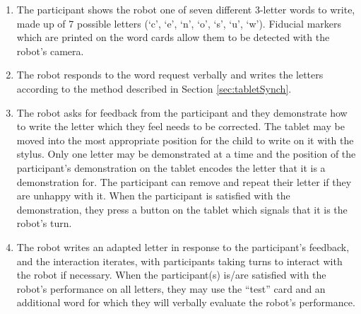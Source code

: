 \documentclass{sig-alternate}
\begin{document}
\begin{enumerate}

    \item The participant shows the robot one of seven different 3-letter words
        to write, made up of 7 possible letters (`c', `e',
        `n', `o', `s', `u', `w'). Fiducial markers which are printed on the word
        cards allow them to be detected with the robot's camera. 

    \item The robot responds to the word request verbally and writes the
        letters according to the method described in Section \ref{sec:tabletSynch}. 

    \item The robot asks for feedback from the participant and they demonstrate
        how to write the letter which they feel needs to be corrected. The
        tablet may be moved into the most appropriate position for the child to
        write on it with the stylus. Only one letter may be demonstrated at a time and the
        position of the participant's demonstration on the tablet encodes the
        letter that it is a demonstration for. The participant can remove and
        repeat their letter if they are unhappy with it.
        When the participant is satisfied with the demonstration, they press a button on
        the tablet which signals that it is the robot's turn.

    \item The robot writes an adapted letter in 
        response to the participant's feedback, and the interaction iterates,
        with participants taking turns to interact with the robot if necessary.
        When the participant(s) is/are satisfied with the robot's performance on 
	all letters,
        they may use the ``test'' card and an additional word for which they will
        verbally evaluate the robot's performance. 

\end{enumerate}
\end{document}
